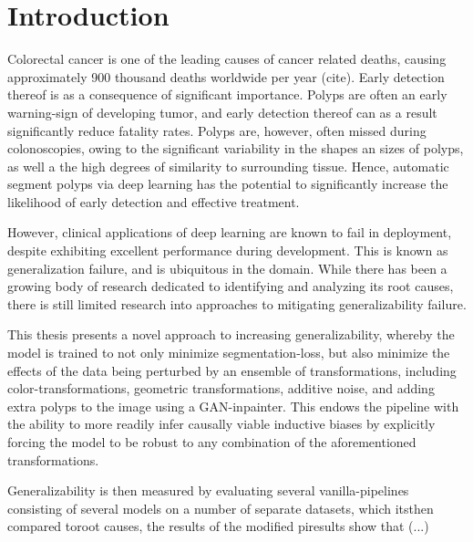     \chapter{Introduction}
    \setcounter{chapter}{1}
    Colorectal cancer is one of the leading causes of cancer related deaths, causing approximately 900 thousand deaths worldwide per year (cite). Early detection thereof is as a consequence of significant importance. Polyps are often an early warning-sign of developing tumor, and early detection thereof can as a result significantly reduce fatality rates. Polyps are, however, often missed during colonoscopies, owing to the significant variability in the shapes an sizes of polyps, as well a the high degrees of similarity to surrounding tissue. Hence, automatic segment polyps via deep learning has the potential to significantly increase the likelihood of early detection and effective treatment. 
    
    However, clinical applications of deep learning are known to fail in deployment, despite exhibiting excellent performance during development. This is known as generalization failure, and is ubiquitous in the domain. While there has been a growing body of research dedicated to identifying and analyzing its root causes, there is still limited research into approaches to mitigating generalizability failure. 
    
    This thesis presents a novel approach to increasing generalizability, whereby the model is trained to not only minimize segmentation-loss, but also minimize the effects of the data being perturbed by an ensemble of transformations, including color-transformations, geometric transformations, additive noise, and adding extra polyps to the image using a GAN-inpainter. This endows the pipeline with the ability to more readily infer causally viable inductive biases by explicitly forcing the model to be robust to any combination of the aforementioned transformations. 
    
    Generalizability is then measured by evaluating several vanilla-pipelines consisting of several models on a number of separate datasets, which itsthen compared toroot causes, the results of the modified piresults show that (...)
    
   

